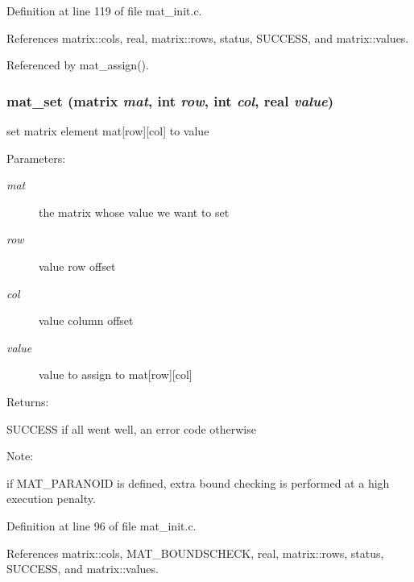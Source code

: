 Definition at line 119 of file mat\_\-init.c.

References matrix::cols, real, matrix::rows, status, SUCCESS, and matrix::values.

Referenced by mat\_\-assign().
\subsubsection{\setlength{\rightskip}{0pt plus 5cm}mat\_\-set ({\bf matrix} {\em mat}, int {\em row}, int {\em col}, {\bf real} {\em value})}\label{group__matrix__initialization_a0}


set matrix element mat[row][col] to value

\begin{Desc}
\item[Parameters: ]\par
\begin{description}
\item[{\em 
mat}]the matrix whose value we want to set \item[{\em 
row}]value row offset \item[{\em 
col}]value column offset \item[{\em 
value}]value to assign to mat[row][col]\end{description}
\end{Desc}
\begin{Desc}
\item[Returns: ]\par
SUCCESS if all went well, an error code otherwise\end{Desc}
\begin{Desc}
\item[Note: ]\par
if MAT\_\-PARANOID is defined, extra bound checking is performed at a high execution penalty. \end{Desc}


Definition at line 96 of file mat\_\-init.c.

References matrix::cols, MAT\_\-BOUNDSCHECK, real, matrix::rows, status, SUCCESS, and matrix::values.